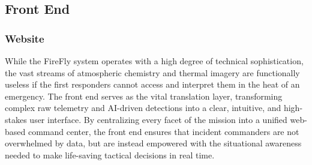 \documentclass[journal, onecolumn]{IEEEtran}
\begin{document}
\subsection{Front End}

\subsubsection{Website}
While the FireFly system operates with a high degree of technical sophistication, the vast streams of atmospheric chemistry and thermal imagery are functionally useless if the first responders cannot access and interpret them in the heat of an emergency. The front end serves as the vital translation layer, transforming complex raw telemetry and AI-driven detections into a clear, intuitive, and high-stakes user interface. By centralizing every facet of the mission into a unified web-based command center, the front end ensures that incident commanders are not overwhelmed by data, but are instead empowered with the situational awareness needed to make life-saving tactical decisions in real time. 
\end{document}
